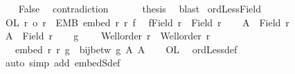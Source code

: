 \begin{isabellebody}
\ {}\ \isamarkupfalse%
\ False\ \isamarkupfalse%
\ contradiction\isanewline
\ \ \isacommand{{\isacharbraceright}{\kern0pt}}\isamarkupfalse%
\isanewline
\ \ \isamarkupfalse%
\ {\isacharquery}{\kern0pt}thesis\ \isamarkupfalse%
\ blast\isanewline
{}\isamarkupfalse%
%
\endisatagproof
{\isafoldproof}%
%
\isadelimproof
\isanewline
%
\endisadelimproof
\isanewline
{}\isamarkupfalse%
\ ordLess{\isacharunderscore}{\kern0pt}Field{\isacharcolon}{\kern0pt}\isanewline
{}\ OL{\isacharcolon}{\kern0pt}\ {\isachardoublequoteopen}r{}\ {\isacharless}{\kern0pt}o\ r{}{\isachardoublequoteclose}\ \ EMB{\isacharcolon}{\kern0pt}\ {\isachardoublequoteopen}embed\ r{}\ r{}\ f{\isachardoublequoteclose}\isanewline
{}\ {\isachardoublequoteopen}{\isasymnot}\ {\isacharparenleft}{\kern0pt}f{\isacharbackquote}{\kern0pt}{\isacharparenleft}{\kern0pt}Field\ r{}{\isacharparenright}{\kern0pt}\ {\isacharequal}{\kern0pt}\ Field\ r{}{\isacharparenright}{\kern0pt}{\isachardoublequoteclose}\isanewline
%
\isadelimproof
%
\endisadelimproof
%
\isatagproof
{}\isamarkupfalse%
{\isacharminus}{\kern0pt}\isanewline
\ \ \isamarkupfalse%
\ {\isacharquery}{\kern0pt}A{}\ {\isacharequal}{\kern0pt}\ {\isachardoublequoteopen}Field\ r{}{\isachardoublequoteclose}\ \ \isamarkupfalse%
\ {\isacharquery}{\kern0pt}A{}\ {\isacharequal}{\kern0pt}\ {\isachardoublequoteopen}Field\ r{}{\isachardoublequoteclose}\isanewline
\ \ \isamarkupfalse%
\ g\ \isanewline
\ \ {}{\isacharcolon}{\kern0pt}\ {\isachardoublequoteopen}Well{\isacharunderscore}{\kern0pt}order\ r{}\ {\isasymand}\ Well{\isacharunderscore}{\kern0pt}order\ r{}{\isachardoublequoteclose}\ \isanewline
\ \ {}{\isacharcolon}{\kern0pt}\ {\isachardoublequoteopen}embed\ r{}\ r{}\ g\ {\isasymand}\ {\isasymnot}{\isacharparenleft}{\kern0pt}bij{\isacharunderscore}{\kern0pt}betw\ g\ {\isacharquery}{\kern0pt}A{}\ {\isacharquery}{\kern0pt}A{}{\isacharparenright}{\kern0pt}{\isachardoublequoteclose}\isanewline
\ \ \isamarkupfalse%
\ OL\ \isamarkupfalse%
\ ordLess{\isacharunderscore}{\kern0pt}def\ \isamarkupfalse%
\ {\isacharparenleft}{\kern0pt}auto\ simp\ add{\isacharcolon}{\kern0pt}\ embedS{\isacharunderscore}{\kern0pt}def{\isacharparenright}{\kern0pt}\isanewline

\end{isabellebody}
